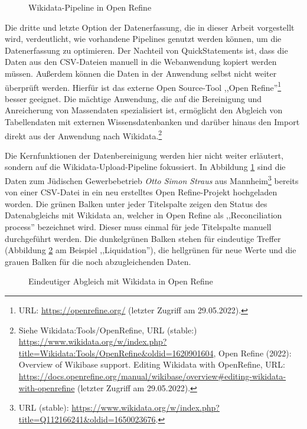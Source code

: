 \begin{figure}[h]
    \centering
    \caption{Wikidata-Pipeline in Open Refine}
    \label{fig:wikidatapipeline}
\end{figure}

Die dritte und letzte Option der Datenerfassung, die in dieser Arbeit vorgestellt wird, verdeutlicht, wie vorhandene Pipelines genutzt werden können, um die Datenerfassung zu optimieren. Der Nachteil von QuickStatements ist, dass die Daten aus den CSV-Dateien manuell in die Webanwendung kopiert werden müssen. Außerdem können die Daten in der Anwendung selbst nicht weiter überprüft werden. Hierfür ist das externe Open Source-Tool ,,Open Refine''\footnote{URL: \url{https://openrefine.org/} (letzter Zugriff am 29.05.2022).} besser geeignet. Die mächtige Anwendung, die auf die Bereinigung und Anreicherung von Massendaten spezialisiert ist, ermöglicht den Abgleich von Tabellendaten mit externen Wissensdatenbanken und darüber hinaus den Import direkt aus der Anwendung nach Wikidata.\footnote{Siehe Wikidata:Tools/OpenRefine, URL (stable:) \url{https://www.wikidata.org/w/index.php?title=Wikidata:Tools/OpenRefine\&oldid=1620901604}, Open Refine (2022): Overview of Wikibase support. Editing Wikidata with OpenRefine, URL: \url{https://docs.openrefine.org/manual/wikibase/overview\#editing-wikidata-with-openrefine} (letzter Zugriff am 29.05.2022).}

Die Kernfunktionen der Datenbereinigung werden hier nicht weiter erläutert, sondern auf die Wikidata-Upload-Pipeline fokussiert. In Abbildung \ref{fig:wikidatapipeline} sind die Daten zum Jüdischen Gewerbebetrieb \textit{Otto Simon Straus} aus Mannheim\footnote{URL (stable): \url{https://www.wikidata.org/w/index.php?title=Q112166241\&oldid=1650023676}.} bereits von einer CSV-Datei in ein neu erstelltes Open Refine-Projekt hochgeladen worden. Die grünen Balken unter jeder Titelspalte zeigen den Status des Datenabgleichs mit Wikidata an, welcher in Open Refine als ,,Reconciliation process'' bezeichnet wird. Dieser muss einmal für jede Titelspalte manuell durchgeführt werden. Die dunkelgrünen Balken stehen für eindeutige Treffer (Abbildung \ref{fig:wikidatareconciliation} am Beispiel ,,Liquidation''), die hellgrünen für neue Werte und die grauen Balken für die noch abzugleichenden Daten. 

\begin{figure}[h]
    \centering
    \caption{Eindeutiger Abgleich mit Wikidata in Open Refine}
    \label{fig:wikidatareconciliation}
\end{figure}

